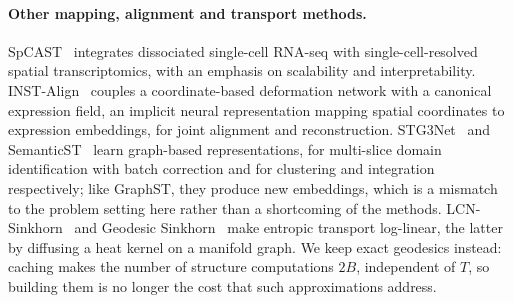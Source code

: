 \paragraph{Other mapping, alignment and transport methods.}
SpCAST~\citep{spcast} integrates dissociated single-cell RNA-seq with single-cell-resolved
spatial transcriptomics, with an emphasis on scalability and interpretability. INST-Align~\citep{han2026instalign} couples a coordinate-based
deformation network with a canonical expression field, an implicit neural representation mapping spatial coordinates
to expression embeddings, for joint alignment and reconstruction. STG3Net~\citep{fang2024stg3net} and
SemanticST~\citep{zahedi2025semanticst} learn graph-based representations, for multi-slice domain identification
with batch correction and for clustering and integration respectively; like GraphST, they produce new embeddings,
which is a mismatch to the problem setting here rather than a shortcoming of the methods. LCN-Sinkhorn~\citep{gasteiger2021lcn}
and Geodesic Sinkhorn~\citep{huguet2022geodesic} make entropic transport log-linear, the latter by diffusing a heat
kernel on a manifold graph. We keep exact geodesics instead: caching makes the number of structure computations
$2B$, independent of $T$, so building them is no longer the cost that such approximations address.
